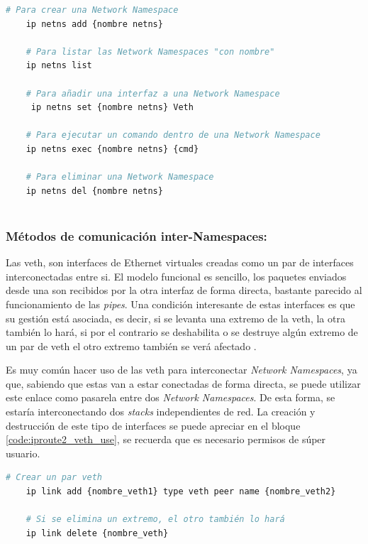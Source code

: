  \begin{lstlisting}[language= bash, style=Consola, caption={Comandos útiles con iproute2 - Netns},label=code:iproute2_ns_use]
    # Para crear una Network Namespace
    ip netns add {nombre netns}
    
    # Para listar las Network Namespaces "con nombre"
    ip netns list
    
    # Para añadir una interfaz a una Network Namespace
     ip netns set {nombre netns} Veth
    
    # Para ejecutar un comando dentro de una Network Namespace
    ip netns exec {nombre netns} {cmd}
    
    # Para eliminar una Network Namespace
    ip netns del {nombre netns}
    
\end{lstlisting}
 
\subsubsection{Métodos de comunicación inter-Namespaces: }
\label{linuxVeths}
Las \gls{veth}, son interfaces de Ethernet virtuales creadas como un par de interfaces interconectadas entre si. El modelo funcional es sencillo, los paquetes enviados desde una son recibidos por la otra interfaz de forma directa, bastante parecido al funcionamiento de las \textit{pipes}. Una condición interesante de estas interfaces es que su gestión está asociada, es decir, si se levanta una extremo de la \gls{veth}, la otra también lo hará, si por el contrario se deshabilita o se destruye algún extremo de un par de \gls{veth} el otro extremo también se verá afectado \cite{veth}.\\
\par
Es muy común hacer uso de las \gls{veth} para interconectar \textit{Network Namespaces}, ya que, sabiendo que estas van a estar conectadas de forma directa, se puede utilizar este enlace como pasarela entre dos \textit{Network Namespaces}. De esta forma, se estaría interconectando dos \textit{stacks} independientes de red. La creación y destrucción de este tipo de interfaces se puede apreciar en el bloque \ref{code:iproute2_veth_use}, se recuerda que es necesario permisos de súper usuario.\\

 \begin{lstlisting}[language= bash, style=Consola, caption={Manejo de Veths},label=code:iproute2_veth_use]
    # Crear un par veth
    ip link add {nombre_veth1} type veth peer name {nombre_veth2}
    
    # Si se elimina un extremo, el otro también lo hará
    ip link delete {nombre_veth}
    
\end{lstlisting}
\vspace{0.5cm}

